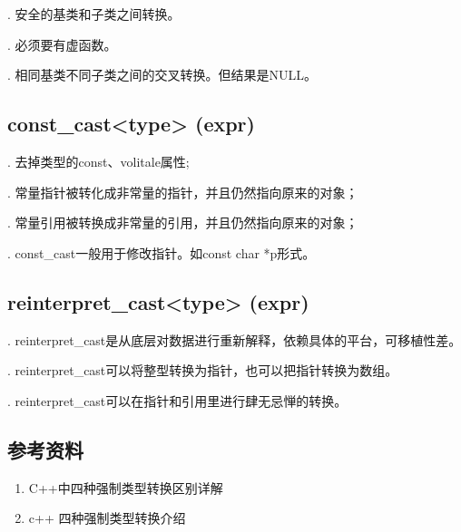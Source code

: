 \documentclass[letterpaper,10pt,english]{sphinxmanual}
\begin{document}
. 安全的基类和子类之间转换。

. 必须要有虚函数。

. 相同基类不同子类之间的交叉转换。但结果是NULL。


\subsection{const\_cast\textless{}type\textgreater{} (expr)}
\label{\detokenize{cpp/10_cast:const-cast-type-expr}}
. 去掉类型的const、volitale属性;

. 常量指针被转化成非常量的指针，并且仍然指向原来的对象；

. 常量引用被转换成非常量的引用，并且仍然指向原来的对象；

. const\_cast一般用于修改指针。如const char *p形式。


\subsection{reinterpret\_cast\textless{}type\textgreater{} (expr)}
\label{\detokenize{cpp/10_cast:reinterpret-cast-type-expr}}
. reinterpret\_cast是从底层对数据进行重新解释，依赖具体的平台，可移植性差。

. reinterpret\_cast可以将整型转换为指针，也可以把指针转换为数组。

. reinterpret\_cast可以在指针和引用里进行肆无忌惮的转换。


\subsection{参考资料}
\label{\detokenize{cpp/10_cast:id2}}\begin{enumerate}
\item {} 
C++中四种强制类型转换区别详解

\end{enumerate}
\begin{quote}

\end{quote}
\begin{enumerate}
\setcounter{enumi}{1}
\item {} 
c++ 四种强制类型转换介绍

\end{enumerate}
\begin{quote}

\end{quote}
\end{document}
